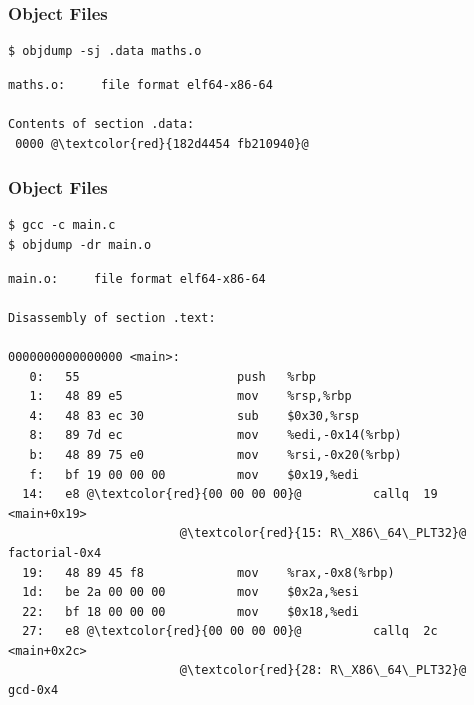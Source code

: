 \documentclass{beamer}
\begin{document}
\begin{frame}[fragile]
\frametitle{Object Files}
\scriptsize
\begin{verbatim}
$ objdump -sj .data maths.o
\end{verbatim}

\begin{lstlisting}[numbers=none]
maths.o:     file format elf64-x86-64

Contents of section .data:
 0000 @\textcolor{red}{182d4454 fb210940}@
\end{lstlisting}
\end{frame}

\begin{frame}[fragile]
\frametitle{Object Files}
\scriptsize
\begin{verbatim}
$ gcc -c main.c
$ objdump -dr main.o
\end{verbatim}
\tiny
\begin{lstlisting}[numbers=none]
main.o:     file format elf64-x86-64

Disassembly of section .text:

0000000000000000 <main>:
   0:   55                      push   %rbp
   1:   48 89 e5                mov    %rsp,%rbp
   4:   48 83 ec 30             sub    $0x30,%rsp
   8:   89 7d ec                mov    %edi,-0x14(%rbp)
   b:   48 89 75 e0             mov    %rsi,-0x20(%rbp)
   f:   bf 19 00 00 00          mov    $0x19,%edi
  14:   e8 @\textcolor{red}{00 00 00 00}@          callq  19 <main+0x19>
                        @\textcolor{red}{15: R\_X86\_64\_PLT32}@      factorial-0x4
  19:   48 89 45 f8             mov    %rax,-0x8(%rbp)
  1d:   be 2a 00 00 00          mov    $0x2a,%esi
  22:   bf 18 00 00 00          mov    $0x18,%edi
  27:   e8 @\textcolor{red}{00 00 00 00}@          callq  2c <main+0x2c>
                        @\textcolor{red}{28: R\_X86\_64\_PLT32}@      gcd-0x4
\end{lstlisting}


\end{frame}
\end{document}
